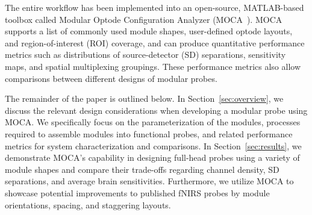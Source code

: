  The entire workflow has been implemented into an open-source, MATLAB-based toolbox called Modular Optode Configuration Analyzer (MOCA~\cite{Vanegas2020}). MOCA supports a list of commonly used module shapes, user-defined optode layouts, and region-of-interest (ROI) coverage, and can produce quantitative performance metrics such as distributions of source-detector (SD) separations, sensitivity maps, and spatial multiplexing groupings. These performance metrics also allow comparisons between different designs of modular probes. 

The remainder of the paper is outlined below. In Section~\ref{sec:overview}, we discuss the relevant design considerations when developing a modular probe using MOCA. We specifically focus on the parameterization of the modules, processes required to assemble modules into functional probes, and related performance metrics for system characterization and comparisons. In Section~\ref{sec:results}, we demonstrate MOCA's capability in designing full-head probes using a variety of module shapes and compare their trade-offs regarding channel density, SD separations, and average brain sensitivities. Furthermore, we utilize MOCA to showcase potential improvements to published fNIRS probes by  module orientations, spacing, and staggering layouts. 

